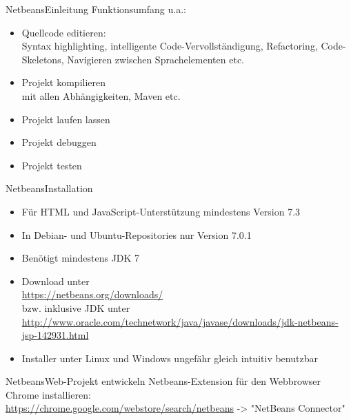 \documentclass[xcolor=dvipsnames,pdftex]{beamer}
\begin{document}
\begin{frame}{Netbeans}{Einleitung}
	Funktionsumfang u.a.:
	\begin{itemize}
		\item Quellcode editieren:\\
			Syntax highlighting, intelligente Code-Vervollständigung,
			Refactoring, Code-Skeletons, Navigieren zwischen
			Sprachelementen etc.
			\pause
		\item Projekt kompilieren\\
			mit allen Abhängigkeiten, Maven etc.
			\pause
		\item Projekt laufen lassen
			\pause
		\item Projekt debuggen
			\pause
		\item Projekt testen
	\end{itemize}
\end{frame}

\begin{frame}{Netbeans}{Installation}
	\begin{itemize}
		\item Für HTML und JavaScript-Unterstützung mindestens Version 7.3
			\pause
		\item In Debian- und Ubuntu-Repositories nur Version 7.0.1
			\pause
		\item Benötigt mindestens JDK 7
			\pause
		\item Download unter\\
			\href{https://netbeans.org/downloads/}{https://netbeans.org/downloads/}\\
			bzw. inklusive JDK unter\\
			\href{http://www.oracle.com/technetwork/java/javase/downloads/jdk-netbeans-jsp-142931.html}{http://www.oracle.com/technetwork/java/javase/downloads/jdk-netbeans-jsp-142931.html}
			\pause
		\item Installer unter Linux und Windows ungefähr gleich intuitiv benutzbar
	\end{itemize}
\end{frame}

\begin{frame}{Netbeans}{Web-Projekt entwickeln}
	Netbeans-Extension für den Webbrowser Chrome installieren:\\
	\href{https://chrome.google.com/webstore/search/netbeans}{https://chrome.google.com/webstore/search/netbeans} -> "NetBeans Connector"
\end{frame}
\end{document}

